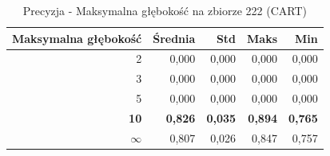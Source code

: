 \begin{table}[htbp]
\centering
\small
\setlength{\tabcolsep}{6pt}
\renewcommand{\arraystretch}{1.2}
\caption{Precyzja - Maksymalna głębokość na zbiorze 222 (CART)}
\label{tab:CART_max_depth_222_precision}
\begin{tabular}{r|r|r|r|r}
\toprule
Maksymalna głębokość & Średnia & Std & Maks & Min \\
\hline
2 & 0,000 & 0,000 & 0,000 & 0,000 \\
3 & 0,000 & 0,000 & 0,000 & 0,000 \\
5 & 0,000 & 0,000 & 0,000 & 0,000 \\
\textbf{10} & \textbf{0,826} & \textbf{0,035} & \textbf{0,894} & \textbf{0,765} \\
$\infty$ & 0,807 & 0,026 & 0,847 & 0,757 \\
\bottomrule
\end{tabular}
\end{table}